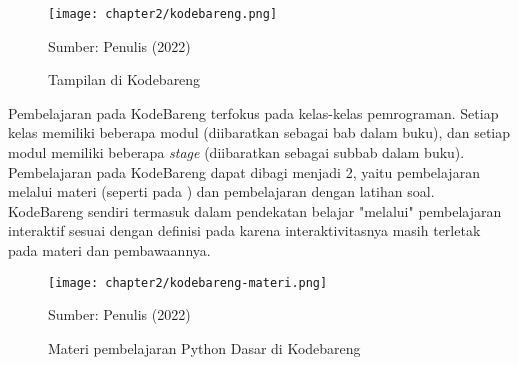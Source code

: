 
\begin{figure}[!h]
  \centering
  \texttt{[image: chapter2/kodebareng.png]}
  \caption{Tampilan di Kodebareng}\label{fig:kodebareng-tampilan}
  Sumber: Penulis (2022)
\end{figure}

Pembelajaran pada KodeBareng terfokus pada kelas-kelas pemrograman. Setiap kelas memiliki beberapa modul (diibaratkan sebagai bab dalam buku), dan setiap modul memiliki beberapa \textit{stage} (diibaratkan sebagai subbab dalam buku). Pembelajaran pada KodeBareng dapat dibagi menjadi 2, yaitu pembelajaran melalui materi (seperti pada ) dan pembelajaran dengan latihan soal. KodeBareng sendiri termasuk dalam pendekatan belajar "melalui" pembelajaran interaktif sesuai dengan definisi pada \textcite{reeves2012interactive} karena interaktivitasnya masih terletak pada materi dan pembawaannya.


\begin{figure}[!h]
  \centering
  \texttt{[image: chapter2/kodebareng-materi.png]}
  \caption{Materi pembelajaran Python Dasar di Kodebareng}\label{fig:kodebareng-materi}
  Sumber: Penulis (2022)
\end{figure}

